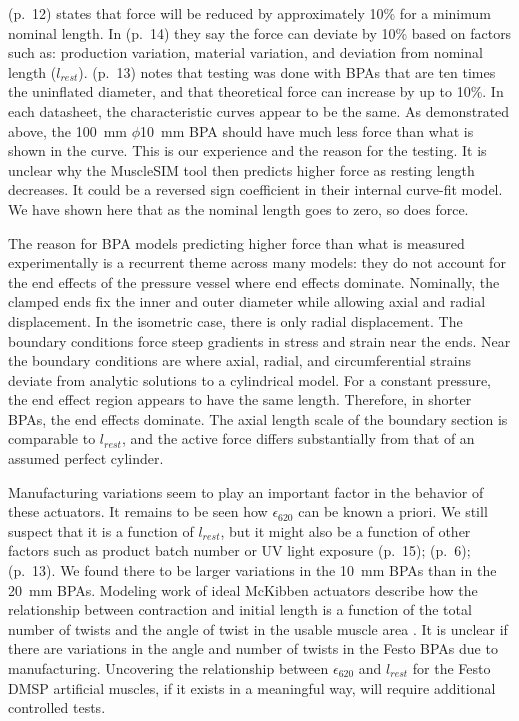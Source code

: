\documentclass[actuators,article,accept,pdftex,moreauthors]{Definitions/mdpi}
\begin{document}
\citet{festo_2026} (p.~12) states that force will be reduced by approximately 10\% for a minimum nominal length. In \citet{festo_2018} (p.~14) they say the force can deviate by 10\% based on factors such as: production variation, material variation, and deviation from nominal length ($l_{rest}$). \citet{festo_2013} (p.~13) notes that testing was done with BPAs that are ten times the uninflated diameter, and that theoretical force can increase by up to 10\%. In each datasheet, the characteristic curves appear to be the same. As demonstrated above, the \qty{100}{\mm} $\phi$\qty{10}{\mm} BPA should have much less force than what is shown in the curve. This is our experience and the reason for the testing. It is unclear why the {MuscleSIM} %
 tool \citep{lang_robert_musclesim_2005} then predicts higher force as resting length decreases. It could be a reversed sign coefficient in their internal curve-fit model. We have shown here that as the nominal length goes to zero, so does force. 

The reason for BPA models predicting higher force than what is measured experimentally is a recurrent theme across many models: they do not account for the end effects of the pressure vessel where end effects dominate.	Nominally, the clamped ends fix the inner and outer diameter while allowing axial and radial displacement. In the isometric case, there is only radial displacement. The boundary conditions force steep gradients in stress and strain near the ends. Near the boundary conditions are where axial, radial, and circumferential strains deviate from analytic solutions to a cylindrical model. For a constant pressure, the end effect region appears to have the same length. Therefore, in shorter BPAs, the end effects dominate. The axial length scale of the boundary section is comparable to $l_{rest}$,  and the active force differs substantially from that of an assumed perfect cylinder.

Manufacturing variations seem to play an important factor in the behavior of these actuators. It remains to be seen how $\epsilon_{620}$ can be known a priori. We still suspect that it is a function of $l_{rest}$, but it might also be a function of other factors such as product batch number or UV light exposure \citep{festo_2026} (p.~15); \citep{festo_2018} (p.~6); \citep{festo_2013} {(p.~13).} %
 We found there to be larger variations in the \qtylist{10}{\mm} BPAs than in the \qtylist{20}{\mm} BPAs. Modeling work of ideal McKibben actuators describe how the relationship between contraction and initial length is a function of the total number of twists and the angle of twist in the usable muscle area \citep{chou_measurement_1996}. It is unclear if there are variations in the angle and number of twists in the Festo BPAs due to manufacturing. Uncovering the relationship between $\epsilon_{620}$ and $l_{rest}$ for the Festo DMSP artificial muscles, if it exists in a meaningful way, will require additional controlled tests. 
\end{document}
